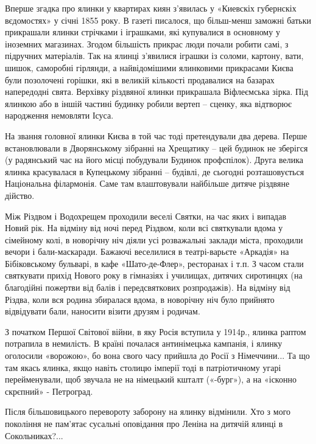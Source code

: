 Вперше згадка про ялинки у квартирах киян з’явилась у «Киевскіх губернскіх
вєдомостях» у січні 1855 року. В газеті писалося, що більш-менш заможні батьки
прикрашали ялинки стрічками і іграшками, які купувалися в основному у іноземних
магазинах. Згодом більшість прикрас люди почали робити самі, з підручних
матеріалів. Так на ялинці з’явилися іграшки із соломи, картону, вати, шишок,
саморобні гірлянди, а найвідомішими ялинковими прикрасами Києва були позолочені
горішки, які в великій кількості продавалися на базарах напередодні свята.
Верхівку різдвяної ялинки прикрашала Віфлеємська зірка. Під ялинкою або в іншій
частині будинку робили вертеп – сценку, яка відтворює народження немовляти
Ісуса.   


На звання головної ялинки Києва в той час тоді претендували два дерева. Перше
встановлювали в Дворянському зібранні на Хрещатику – цей будинок не зберігся
(у радянський час на його місці побудували Будинок профспілок). Друга велика
ялинка красувалася в Купецькому зібранні – будівлі, де сьогодні розташовується
Національна філармонія. Саме там влаштовували найбільше дитяче різдвяне
дійство.

Між Різдвом і Водохрещем проходили веселі Святки, на час яких і випадав Новий
рік. На відміну від ночі перед Різдвом, коли всі святкували вдома у сімейному
колі, в новорічну ніч діяли усі розважальні заклади міста, проходили вечори і
бали-маскаради. Бажаючі веселилися в театрі-варьєте «Аркадія» на Бібіковському
бульварі, в кафе «Шато-де-Флер», ресторанах і т.п. З часом стали святкувати
прихід Нового року в гімназіях і училищах, дитячих сиротинцях (на благодійні
пожертви від балів і передсвяткових розпродажів). На відміну від Різдва, коли
вся родина збиралася вдома, в новорічну ніч було прийнято відвідувати бали,
наносити візити друзям і родичам. 

З початком Першої Світової війни, в яку Росія вступила у 1914р., ялинка раптом
потрапила в немилість. В країні почалася антинімецька кампанія, і ялинку
оголосили «ворожою», бо вона свого часу прийшла до Росії з Німеччини... Та що там
якась ялинка, якщо навіть столицю імперії тоді в патріотичному угарі
перейменували, щоб звучала не на німецький кшталт («-бург»), а на «ісконно
скрєпний» - Петроград.

Після більшовицького перевороту заборону на ялинку відмінили. Хто з мого
покоління не пам’ятає сусальні оповідання про Леніна на дитячій ялинці в
Сокольниках?...

